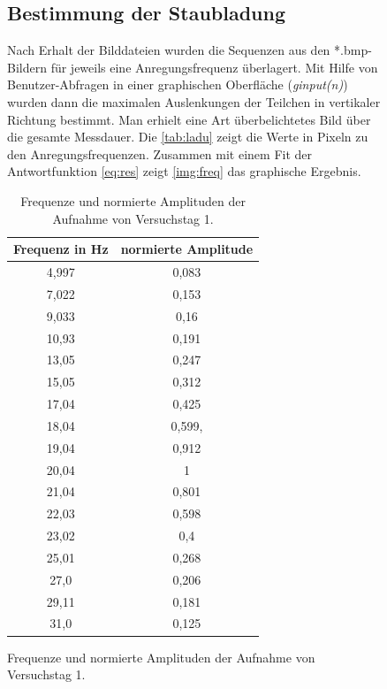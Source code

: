 \documentclass[numbers=noenddot,a4paper,notitlepage,twoside,BCOR15mm]{scrartcl}
\newcommand{\tilt}[1]{\textit{#1}}
\begin{document}
	\vspace{-1cm}
		\begin{figure}[H]
			\begin{minipage}{0.45\textwidth}

			\subsection{Bestimmung der Staubladung}
				Nach Erhalt der Bilddateien wurden die Sequenzen aus den *.bmp-Bildern für jeweils eine Anregungsfrequenz überlagert. Mit Hilfe von Benutzer-Abfragen in einer graphischen Oberfläche  (\tilt{ginput(n)}) wurden dann die maximalen Auslenkungen der Teilchen in vertikaler Richtung bestimmt. Man erhielt eine Art überbelichtetes Bild über die gesamte Messdauer. Die \autoref{tab:ladu} zeigt die Werte in Pixeln zu den Anregungsfrequenzen. Zusammen mit einem Fit der Antwortfunktion \autoref{eq:res} zeigt \autoref{img:freq} das graphische Ergebnis.

			\end{minipage}
			\hspace{1cm}
			\begin{minipage}{0.3\textwidth}
				\centering
				\begin{table}[H]
					\begin{tabular}{c|c}
						\hline Frequenz in Hz & normierte Amplitude \\ 
						\hline \hline 4,997 & 0,083 \\
						\hline 7,022 &  0,153\\ 
						\hline 9,033 &  0,16\\ 
						\hline  10,93&  0,191\\ 
						\hline  13,05&  0,247\\ 
						\hline  15,05&  0,312\\ 
						\hline  17,04&  0,425\\ 
						\hline  18,04&  0,599,\\ 
						\hline 19,04 &  0,912\\ 
						\hline  20,04&  1\\ 
						\hline  21,04&  0,801\\ 
						\hline  22,03&  0,598\\ 
						\hline  23,02&  0,4\\ 
						\hline  25,01&  0,268\\ 
						\hline  27,0&  0,206\\ 
						\hline  29,11&  0,181\\ 
						\hline  31,0& 0,125 
					\end{tabular}
					\caption{Frequenze und normierte Amplituden der Aufnahme von Versuchstag 1.}\label{tab:ladu}
				\end{table}

			\end{minipage}
		\end{figure}
\end{document}
